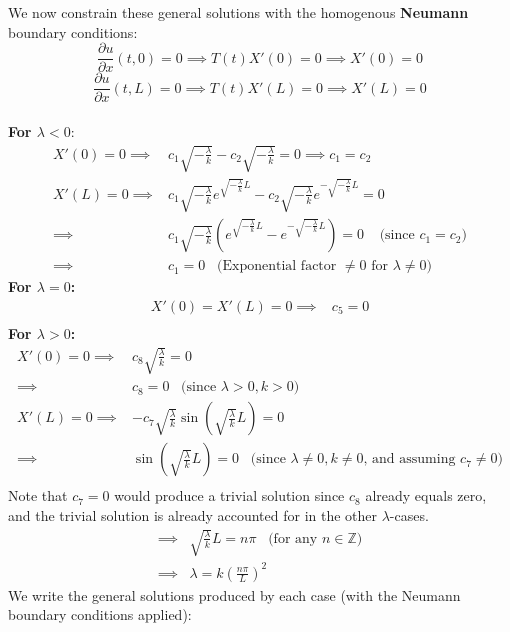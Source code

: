 \documentclass[12pt]{article}
\begin{document}
\begin{enumerate}[(a)]
{We now constrain these general solutions with the homogenous \textbf{Neumann} boundary conditions: \\ $$\frac{\partial u}{\partial x} (t,0) = 0 \implies T(t)X'(0) = 0 \implies X'(0) = 0 $$ 
$$\frac{\partial u}{\partial x}(t,L) = 0 \implies T(t)X'(L) = 0 \implies X'(L) = 0$$ \\
\textbf{For $\lambda < 0$}:
\begin{align*}
X'(0) = 0 \implies& c_1 \sqrt{-\frac{\lambda}{k}} - c_2 \sqrt{-\frac{\lambda}{k}} = 0 \implies \boxed{c_1 = c_2} \\
X'(L) = 0 \implies& c_1 \sqrt{-\frac{\lambda}{k}} e^{\sqrt{-\frac{\lambda}{k}} L} - c_2 \sqrt{-\frac{\lambda}{k}} e^{-\sqrt{-\frac{\lambda}{k}} L} = 0 \\ 
\implies& c_1 \sqrt{-\frac{\lambda}{k}} \left( e^{\sqrt{-\frac{\lambda}{k}} L} - e^{-\sqrt{-\frac{\lambda}{k}} L}   \right) = 0 \;\;\;\; \text{(since $c_1 = c_2$)} \\
\implies& \boxed{c_1 = 0} \;\;\; \text{(Exponential factor $\neq 0$ for $\lambda \neq 0$)}
\end{align*}
\textbf{For $\lambda = 0$:} \\
\begin{align*}
X'(0) = X'(L) = 0 \implies& \boxed{c_5 = 0} \\
\end{align*}
\textbf{For $\lambda > 0$:} \\
\begin{align*}
X'(0) = 0 \implies& c_8 \sqrt{\frac{\lambda}{k}} = 0 \\
\implies& \boxed{c_8 = 0} \;\;\; \text{(since $\lambda > 0, k > 0$)} \\
X'(L) = 0 \implies& -c_7 \sqrt{\frac{\lambda}{k}} \sin \left( \sqrt{\frac{\lambda}{k}} L \right) = 0 \\
\implies& \sin \left( \sqrt{\frac{\lambda}{k}} L \right) = 0 \;\;\; \text{(since $\lambda \neq 0, k \neq 0$, and assuming $c_7 \neq 0$)} \\
\end{align*}
Note that $c_7 = 0$ would produce a trivial solution since $c_8$ already equals zero, and the trivial solution is already accounted for in the other $\lambda$-cases.
\begin{align*}
\implies& \sqrt{\frac{\lambda}{k}} L = n\pi \;\;\; \text{(for any $n \in \mathbb{Z}$)} \\
\implies& \boxed{\lambda = k \left( \frac{n\pi}{L} \right)^2}
\end{align*}
We write the general solutions produced by each case (with the Neumann boundary conditions applied): \\ \\
}
\end{enumerate}
\end{document}
